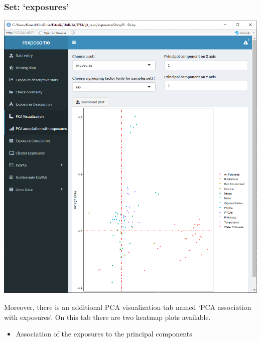 \documentclass[
]{book}
\providecommand{\tightlist}{%
  \setlength{\itemsep}{0pt}\setlength{\parskip}{0pt}}
\begin{document}
\hypertarget{set-exposures}{%
\subsubsection{Set: `exposures'}\label{set-exposures}}

\includegraphics{images/analysis5_2_2.png}

Moreover, there is an additional PCA visualization tab named `PCA association with exposures'. On this tab there are two heatmap plots available.

\begin{itemize}
\tightlist
\item
  Association of the exposures to the principal components
\end{itemize}
\end{document}
